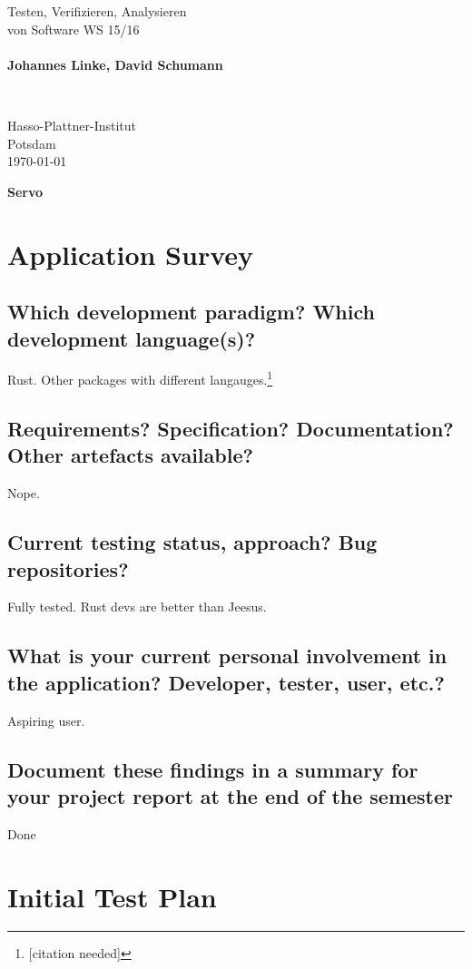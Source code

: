 \documentclass{scrartcl}
\begin{document}
\pagestyle{plain}


\noindent
\begin{minipage}{0.66\textwidth}
Testen, Verifizieren, Analysieren\\
von Software WS 15/16\\
~\\
\textbf{Johannes Linke, David Schumann}
\end{minipage}
~
\begin{minipage}{0.30\textwidth}
Hasso-Plattner-Institut\\
Potsdam\\
\today
\end{minipage}


\begin{center}
 \huge \bf Servo
\end{center}

\section{Application Survey}


\subsection*{Which development paradigm? Which development
language(s)?}
Rust. Other packages with different langauges.\footnote{[citation needed]}
\subsection*{Requirements? Specification? Documentation? Other artefacts available?}
Nope.
\subsection*{Current testing status, approach? Bug repositories?}
Fully tested. Rust devs are better than Jeesus.
\subsection*{What is your current personal involvement in the
application? Developer, tester, user, etc.?}
Aspiring user.
\subsection*{Document these findings in a summary for your project report at the end of the semester}
Done\\

\section{Initial Test Plan}
\end{document}
